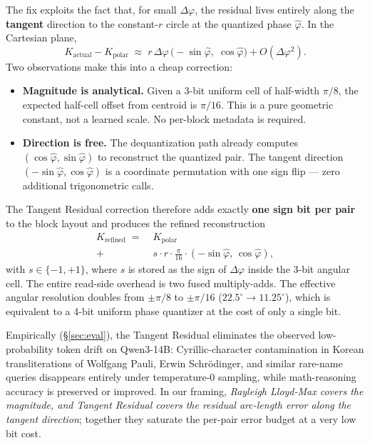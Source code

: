 \documentclass[10pt,twocolumn]{article}
\begin{document}
The fix exploits the fact that, for small $\Delta\varphi$, the residual lives entirely along the \textbf{tangent} direction to the constant-$r$ circle at the quantized phase $\hat\varphi$. In the Cartesian plane,
\begin{equation}
K_{\text{actual}} - K_{\text{polar}} \;\approx\; r\,\Delta\varphi\,\bigl(-\!\sin\hat\varphi,\;\cos\hat\varphi\bigr) + O(\Delta\varphi^2).
\end{equation}
Two observations make this into a cheap correction:

\begin{itemize}[leftmargin=*,topsep=1pt,itemsep=1pt]
\item \textbf{Magnitude is analytical.} Given a 3-bit uniform cell of half-width $\pi/8$, the expected half-cell offset from centroid is $\pi/16$. This is a pure geometric constant, not a learned scale. No per-block metadata is required.
\item \textbf{Direction is free.} The dequantization path already computes $(\cos\hat\varphi,\sin\hat\varphi)$ to reconstruct the quantized pair. The tangent direction $(-\sin\hat\varphi,\cos\hat\varphi)$ is a coordinate permutation with one sign flip --- zero additional trigonometric calls.
\end{itemize}

The Tangent Residual correction therefore adds exactly \textbf{one sign bit per pair} to the block layout and produces the refined reconstruction
\begin{equation}
\label{eq:tangent-correction}
\begin{aligned}
K_{\text{refined}} \;=\;& K_{\text{polar}} \\
 +\;& s\cdot r\cdot\tfrac{\pi}{16}\cdot(-\!\sin\hat\varphi,\,\cos\hat\varphi),
\end{aligned}
\end{equation}
with $s\in\{-1,+1\}$, where $s$ is stored as the sign of $\Delta\varphi$ inside the 3-bit angular cell. The entire read-side overhead is two fused multiply-adds. The effective angular resolution doubles from $\pm\pi/8$ to $\pm\pi/16$ ($22.5^\circ\!\to\!11.25^\circ$), which is equivalent to a 4-bit uniform phase quantizer at the cost of only a single bit.

Empirically (\S\ref{sec:eval}), the Tangent Residual eliminates the observed low-probability token drift on Qwen3-14B: Cyrillic-character contamination in Korean transliterations of Wolfgang Pauli, Erwin Schr\"{o}dinger, and similar rare-name queries disappears entirely under temperature-$0$ sampling, while math-reasoning accuracy is preserved or improved. In our framing, \emph{Rayleigh Lloyd-Max covers the magnitude, and Tangent Residual covers the residual arc-length error along the tangent direction}; together they saturate the per-pair error budget at a very low bit cost.
\end{document}
